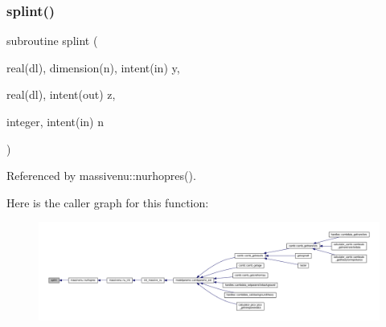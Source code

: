 \subsubsection{\texorpdfstring{splint()}{splint()}}
{\footnotesize\ttfamily subroutine splint (\begin{DoxyParamCaption}\item[{real(dl), dimension(n), intent(in)}]{y,  }\item[{real(dl), intent(out)}]{z,  }\item[{integer, intent(in)}]{n }\end{DoxyParamCaption})}



Referenced by massivenu\+::nurhopres().

Here is the caller graph for this function\+:
\nopagebreak
\begin{figure}[H]
\begin{center}
\leavevmode
\includegraphics[width=350pt]{subroutines_8f90_a5cc3dda624e58340fa2d833b839c3b95_icgraph}
\end{center}
\end{figure}
